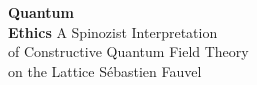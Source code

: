 \thispagestyle{empty}

\null
\vfill
\begin{center}
{\Huge \textbf{Quantum\\Ethics}}
\vskip 1.2cm
A Spinozist Interpretation\\
of Constructive Quantum Field Theory\\
on the Lattice
\vskip 2cm
{\large Sébastien Fauvel}
\end{center}
\vfill
\null
